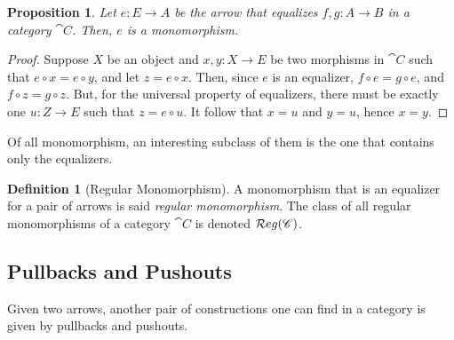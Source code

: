 \documentclass[a4paper, twoside,openright]{report}
\theoremstyle{plain}
\newtheorem{prop}[theorem]{Proposition}
\theoremstyle{definition}
\newtheorem{definition}[theorem]{Definition}
\begin{document}
\begin{prop}\label{prop:eq_are_mono}
    Let $e: E \rightarrow A$ be the arrow that equalizes $f, g : A \rightarrow B$ in a category $\cat C$. Then, $e$ is a monomorphism.
\end{prop}

\begin{proof}
    Suppose $X$ be an object and $x, y: X \rightarrow E$ be two morphisms in $\cat C$ such that $e \circ x = e \circ y$, and let $z = e \circ x$. Then, since $e$ is an equalizer, $f \circ e = g \circ e$, and $f \circ z = g \circ z$. But, for the universal property of equalizers, there must be exactly one $u: Z \rightarrow E$ such that $z = e \circ u$. It follow that $x = u$ and $y = u$, hence $x = y$.
\end{proof}

Of all monomorphism, an interesting subclass of them is the one that contains only the equalizers.

\begin{definition}[Regular Monomorphism]\label{def:reg_mono}
    A monomorphism that is an equalizer for a pair of arrows is said \emph{regular monomorphism}. The class of all regular monomorphisms of a category $\cat C$ is denoted $\mathcal{R}eg(\mathscr{C})$.
\end{definition}

\subsection{Pullbacks and Pushouts}

Given two arrows, another pair of constructions one can find in a category is given by pullbacks and pushouts.
\end{document}
